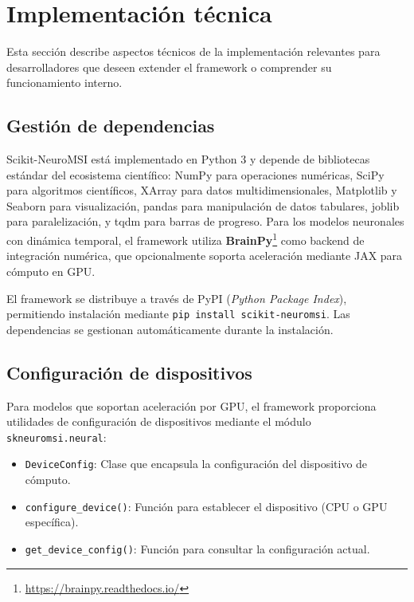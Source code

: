 \section{Implementación técnica}
\label{sec:snmsi_implementacion}

Esta sección describe aspectos técnicos de la implementación relevantes para desarrolladores que deseen extender el framework o comprender su funcionamiento interno.

\subsection{Gestión de dependencias}
\label{subsec:snmsi_dependencias}

Scikit-NeuroMSI está implementado en Python 3 y depende de bibliotecas estándar del ecosistema científico: NumPy para operaciones numéricas, SciPy para algoritmos científicos, XArray para datos multidimensionales, Matplotlib y Seaborn para visualización, pandas para manipulación de datos tabulares, joblib para paralelización, y tqdm para barras de progreso. Para los modelos neuronales con dinámica temporal, el framework utiliza \textbf{BrainPy}\footnote{\url{https://brainpy.readthedocs.io/}} como backend de integración numérica, que opcionalmente soporta aceleración mediante JAX para cómputo en GPU.

El framework se distribuye a través de PyPI (\textit{Python Package Index}), permitiendo instalación mediante \texttt{pip install scikit-neuromsi}. Las dependencias se gestionan automáticamente durante la instalación.


\subsection{Configuración de dispositivos}
\label{subsec:snmsi_dispositivos}

Para modelos que soportan aceleración por GPU, el framework proporciona utilidades de configuración de dispositivos mediante el módulo \texttt{skneuromsi.neural}:

\begin{itemize}
    \item \texttt{DeviceConfig}: Clase que encapsula la configuración del dispositivo de cómputo.
    \item \texttt{configure\_device()}: Función para establecer el dispositivo (CPU o GPU específica).
    \item \texttt{get\_device\_config()}: Función para consultar la configuración actual.
\end{itemize}

